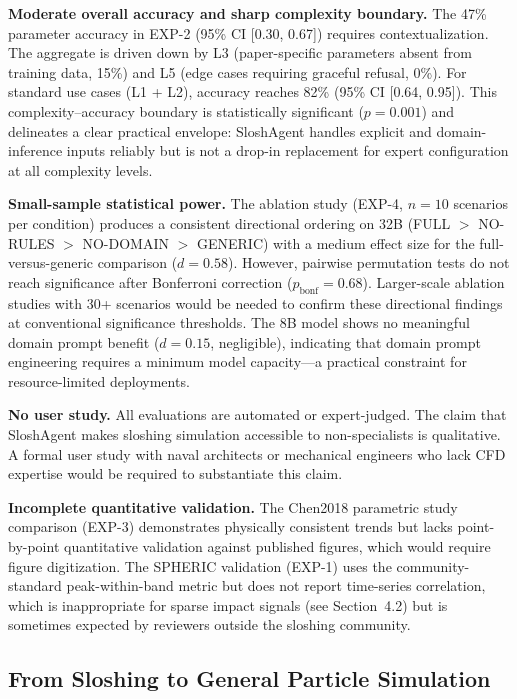 \documentclass[11pt]{article}
\begin{document}
\textbf{Moderate overall accuracy and sharp complexity boundary.} The 47\% parameter accuracy in EXP-2 (95\% CI [0.30, 0.67]) requires contextualization. The aggregate is driven down by L3 (paper-specific parameters absent from training data, 15\%) and L5 (edge cases requiring graceful refusal, 0\%). For standard use cases (L1 + L2), accuracy reaches 82\% (95\% CI [0.64, 0.95]). This complexity--accuracy boundary is statistically significant ($p = 0.001$) and delineates a clear practical envelope: SloshAgent handles explicit and domain-inference inputs reliably but is not a drop-in replacement for expert configuration at all complexity levels.

\textbf{Small-sample statistical power.} The ablation study (EXP-4, $n = 10$ scenarios per condition) produces a consistent directional ordering on 32B (FULL $>$ NO-RULES $>$ NO-DOMAIN $>$ GENERIC) with a medium effect size for the full-versus-generic comparison ($d = 0.58$). However, pairwise permutation tests do not reach significance after Bonferroni correction ($p_{\text{bonf}} = 0.68$). Larger-scale ablation studies with 30+ scenarios would be needed to confirm these directional findings at conventional significance thresholds. The 8B model shows no meaningful domain prompt benefit ($d = 0.15$, negligible), indicating that domain prompt engineering requires a minimum model capacity---a practical constraint for resource-limited deployments.

\textbf{No user study.} All evaluations are automated or expert-judged. The claim that SloshAgent makes sloshing simulation accessible to non-specialists is qualitative. A formal user study with naval architects or mechanical engineers who lack CFD expertise would be required to substantiate this claim.

\textbf{Incomplete quantitative validation.} The Chen2018 parametric study comparison (EXP-3) demonstrates physically consistent trends but lacks point-by-point quantitative validation against published figures, which would require figure digitization. The SPHERIC validation (EXP-1) uses the community-standard peak-within-band metric but does not report time-series correlation, which is inappropriate for sparse impact signals (see Section~4.2) but is sometimes expected by reviewers outside the sloshing community.

\subsection{From Sloshing to General Particle Simulation}
\end{document}
